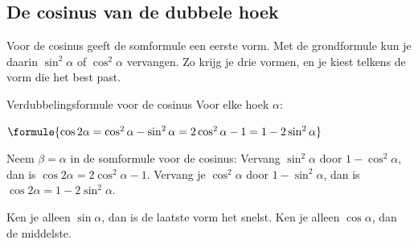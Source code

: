
\begin{oefeningen}
\end{oefeningen}

\subsection{De cosinus van de dubbele hoek}

Voor de cosinus geeft de somformule een eerste vorm. Met de grondformule kun je daarin $\sin^2\alpha$ of $\cos^2\alpha$ vervangen. Zo krijg je drie vormen, en je kiest telkens de vorm die het best past.

\begin{theorie}
\begin{stelling}{Verdubbelingsformule voor de cosinus}
Voor elke hoek $\alpha$:

\vspace{1mm}
\qquad $\formule{\cos 2\alpha = \cos^2\alpha - \sin^2\alpha = 2\cos^2\alpha - 1 = 1 - 2\sin^2\alpha}$
\end{stelling}
\begin{bewijs}
Neem $\beta = \alpha$ in de somformule voor de cosinus:
Vervang $\sin^2\alpha$ door $1 - \cos^2\alpha$, dan is $\cos 2\alpha = 2\cos^2\alpha - 1$. Vervang je $\cos^2\alpha$ door $1 - \sin^2\alpha$, dan is $\cos 2\alpha = 1 - 2\sin^2\alpha$.
\end{bewijs}
\end{theorie}

Ken je alleen $\sin\alpha$, dan is de laatste vorm het snelst. Ken je alleen $\cos\alpha$, dan de middelste.

